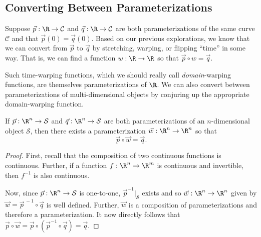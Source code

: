 \subsection{Converting Between Parameterizations}
Suppose $\vec p:\R\to\mathcal C$ and $\vec q:\R\to\mathcal C$ are both parameterizations of
the same curve $\mathcal C$ and that $\vec p(0)=\vec q(0)$.  Based on our previous explorations,
we know that we can convert from $\vec p$ to $\vec q$ by stretching, warping, or flipping ``time''
in some way.  That is, we can find a function $w:\R\to\R$ so that $\vec p\circ w=\vec q$.

Such time-warping functions, which we should really call \emph{domain}-warping
functions,
are themselves parameterizations of $\R$.  We can also
convert between parameterizations of multi-dimensional objects by conjuring up the
appropriate domain-warping function.

\begin{theorem}
	If $\vec p:\R^n\to\mathcal S$ and $\vec q:\R^n\to\mathcal S$ are both
	parameterizations of an $n$-dimensional object $\mathcal S$, then there exists a parameterization
	$\vec w:\R^n\to\R^n$ so that 
	\[
		\vec p\circ \vec w = \vec q.
	\]
\end{theorem}
\begin{proof}
	First, recall that the composition of two continuous functions is continuous.  Further,
	if a function $f:\R^n\to\R^m$ is continuous and invertible, then $f^{-1}$ is also continuous.

	Now, since $\vec p:\R^n\to\mathcal S$ is one-to-one, $\vec p^{-1}\Big|_{\mathcal S}$ exists
	and so $\vec w:\R^n\to\R^n$ given by $\vec w=\vec p^{\,-1}\circ\vec q$ is well defined.  Further, $\vec w$
	is a composition of parameterizations and therefore a parameterization.  It now directly follows that
	$\vec p\circ \vec w= \vec p\circ(\vec p^{-1}\circ \vec q) = \vec q$.
\end{proof}

